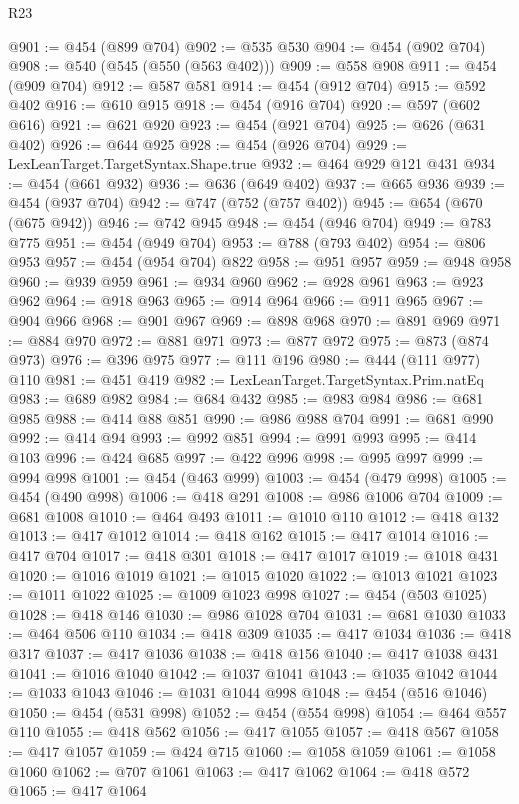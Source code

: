 \begin{lexlean}{R23}
\begin{coremodule}
{{{{{{{{{{{{{{{{{{{{{{{{{{{{{{{{{{{{{{{{{{{{{{{{{{{{{{{{{{{{{{{{{{{{{{{{{{{{{{{{{{{{{{{{{{{{{@901 := @454 (@899 @704)
@902 := @535 @530
@904 := @454 (@902 @704)
@908 := @540 (@545 (@550 (@563 @402)))
@909 := @558 @908
@911 := @454 (@909 @704)
@912 := @587 @581
@914 := @454 (@912 @704)
@915 := @592 @402
@916 := @610 @915
@918 := @454 (@916 @704)
@920 := @597 (@602 @616)
@921 := @621 @920
@923 := @454 (@921 @704)
@925 := @626 (@631 @402)
@926 := @644 @925
@928 := @454 (@926 @704)
@929 := LexLeanTarget.TargetSyntax.Shape.true
@932 := @464 @929 @121 @431
@934 := @454 (@661 @932)
@936 := @636 (@649 @402)
@937 := @665 @936
@939 := @454 (@937 @704)
@942 := @747 (@752 (@757 @402))
@945 := @654 (@670 (@675 @942))
@946 := @742 @945
@948 := @454 (@946 @704)
@949 := @783 @775
@951 := @454 (@949 @704)
@953 := @788 (@793 @402)
@954 := @806 @953
@957 := @454 (@954 @704) @822
@958 := @951 @957
@959 := @948 @958
@960 := @939 @959
@961 := @934 @960
@962 := @928 @961
@963 := @923 @962
@964 := @918 @963
@965 := @914 @964
@966 := @911 @965
@967 := @904 @966
@968 := @901 @967
@969 := @898 @968
@970 := @891 @969
@971 := @884 @970
@972 := @881 @971
@973 := @877 @972
@975 := @873 (@874 @973)
@976 := @396 @975
@977 := @111 @196
@980 := @444 (@111 @977) @110
@981 := @451 @419
@982 := LexLeanTarget.TargetSyntax.Prim.natEq
@983 := @689 @982
@984 := @684 @432
@985 := @983 @984
@986 := @681 @985
@988 := @414 @88 @851
@990 := @986 @988 @704
@991 := @681 @990
@992 := @414 @94
@993 := @992 @851
@994 := @991 @993
@995 := @414 @103
@996 := @424 @685
@997 := @422 @996
@998 := @995 @997
@999 := @994 @998
@1001 := @454 (@463 @999)
@1003 := @454 (@479 @998)
@1005 := @454 (@490 @998)
@1006 := @418 @291
@1008 := @986 @1006 @704
@1009 := @681 @1008
@1010 := @464 @493
@1011 := @1010 @110
@1012 := @418 @132
@1013 := @417 @1012
@1014 := @418 @162
@1015 := @417 @1014
@1016 := @417 @704
@1017 := @418 @301
@1018 := @417 @1017
@1019 := @1018 @431
@1020 := @1016 @1019
@1021 := @1015 @1020
@1022 := @1013 @1021
@1023 := @1011 @1022
@1025 := @1009 @1023 @998
@1027 := @454 (@503 @1025)
@1028 := @418 @146
@1030 := @986 @1028 @704
@1031 := @681 @1030
@1033 := @464 @506 @110
@1034 := @418 @309
@1035 := @417 @1034
@1036 := @418 @317
@1037 := @417 @1036
@1038 := @418 @156
@1040 := @417 @1038 @431
@1041 := @1016 @1040
@1042 := @1037 @1041
@1043 := @1035 @1042
@1044 := @1033 @1043
@1046 := @1031 @1044 @998
@1048 := @454 (@516 @1046)
@1050 := @454 (@531 @998)
@1052 := @454 (@554 @998)
@1054 := @464 @557 @110
@1055 := @418 @562
@1056 := @417 @1055
@1057 := @418 @567
@1058 := @417 @1057
@1059 := @424 @715
@1060 := @1058 @1059
@1061 := @1058 @1060
@1062 := @707 @1061
@1063 := @417 @1062
@1064 := @418 @572
@1065 := @417 @1064
}}}}}}}}}}}}}}}}}}}}}}}}}}}}}}}}}}}}}}}}}}}}}}}}}}}}}}}}}}}}}}}}}}}}}}}}}}}}}}}}}}}}}}}}}}}}}
\end{coremodule}
\end{lexlean}
